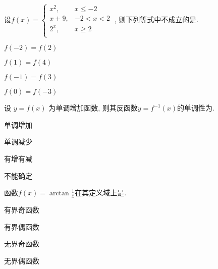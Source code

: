 				\begin{problem}
					设$f\left( x \right) = \left\{ \begin{matrix}
					x^{2}, &x \leq - 2 \\
					x + 9, &- 2 < x < 2 \\
					2^{x}, &x \geq 2 \\
					\end{matrix} \right.\ $, 则下列等式中不成立的是.
					
					
					\begin{abcd} \item $f\left( - 2 \right) = f\left( 2 \right)$
						
						\item $f\left( 1 \right) = f\left( 4 \right)$
						
						\item $f\left( - 1 \right) = f\left( 3 \right)$
						
						\item $f\left( 0 \right) = f\left( - 3 \right)$
						
				\end{abcd}  \end{problem}
				
				\begin{problem}
					设 $y = f\left( x \right)$
					为单调增加函数, 则其反函数$y = f^{- 1}\left( x \right)$的单调性为\pickin{A}.
					
					
					\begin{abcd} \item 单调增加
						
						\item 单调减少
						
						\item 有增有减
						
						\item 不能确定
						
				\end{abcd}  \end{problem}
				
				\begin{problem}
					函数$f\left( x \right) = \arctan\frac{1}{x}$在其定义域上是.
					
					
					\begin{abcd} \item 有界奇函数
						
						\item 有界偶函数
						
						\item 无界奇函数
						
						\item 无界偶函数
						
				\end{abcd}  \end{problem}
				
